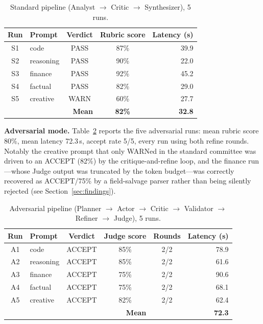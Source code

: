\documentclass{article}
\begin{document}
\begin{table}[t]
\centering
\caption{Standard pipeline (Analyst $\rightarrow$ Critic $\rightarrow$ Synthesizer), 5 runs.}
\label{tab:standard}
\begin{tabular}{@{}clccr@{}}
\toprule
Run & Prompt & Verdict & Rubric score & Latency (s) \\
\midrule
S1 & code      & PASS & 87\% & 39.9 \\
S2 & reasoning & PASS & 90\% & 22.0 \\
S3 & finance   & PASS & 92\% & 45.2 \\
S4 & factual   & PASS & 82\% & 29.0 \\
S5 & creative  & WARN & 60\% & 27.7 \\
\midrule
\multicolumn{3}{r}{\textbf{Mean}} & \textbf{82\%} & \textbf{32.8} \\
\bottomrule
\end{tabular}
\end{table}

\textbf{Adversarial mode.} Table~\ref{tab:adversarial} reports the five adversarial runs:
mean rubric score 80\%, mean latency 72.3\,s, accept rate 5/5, every run using both refine
rounds. Notably the creative prompt that only WARNed in the standard committee was driven to
an ACCEPT (82\%) by the critique-and-refine loop, and the finance run---whose Judge output was
truncated by the token budget---was correctly recovered as ACCEPT/75\% by a field-salvage
parser rather than being silently rejected (see Section~\ref{sec:findings}).

\begin{table}[t]
\centering
\caption{Adversarial pipeline (Planner $\rightarrow$ Actor $\rightarrow$ Critic $\rightarrow$
Validator $\rightarrow$ Refiner $\rightarrow$ Judge), 5 runs.}
\label{tab:adversarial}
\begin{tabular}{@{}clcccr@{}}
\toprule
Run & Prompt & Verdict & Judge score & Rounds & Latency (s) \\
\midrule
A1 & code      & ACCEPT & 85\% & 2/2 & 78.9 \\
A2 & reasoning & ACCEPT & 85\% & 2/2 & 61.6 \\
A3 & finance   & ACCEPT & 75\% & 2/2 & 90.6 \\
A4 & factual   & ACCEPT & 75\% & 2/2 & 68.1 \\
A5 & creative  & ACCEPT & 82\% & 2/2 & 62.4 \\
\midrule
\multicolumn{4}{r}{\textbf{Mean}} & & \textbf{72.3} \\
\bottomrule
\end{tabular}
\end{table}
\end{document}
